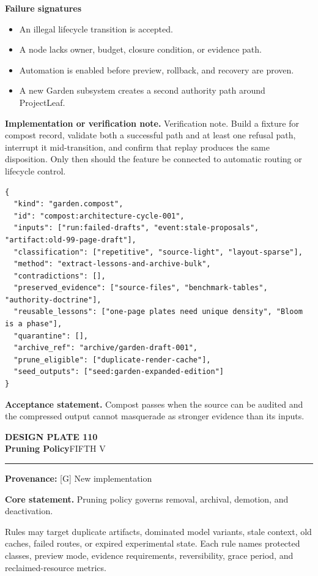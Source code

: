 \documentclass[10pt,letterpaper,oneside]{article}
\newcommand{\prov}[1]{\textcolor{gardenBlue}{\sffamily\footnotesize\textbf{Provenance:} #1}}
\newcommand{\platetitle}[3]{%
  \begin{minipage}[t][0.54in][t]{\textwidth}
  {\sffamily\bfseries\color{gardenDeep}\fontsize{9}{10}\selectfont DESIGN PLATE #1}\\[-1pt]
  {\sffamily\bfseries\color{gardenInk}\fontsize{16.5}{18}\selectfont #2}\hfill{\sffamily\color{gardenGreen}\large #3}
  \end{minipage}\vspace{-2pt}\hrule\vspace{5pt}}
\begin{document}
\textbf{Failure signatures}
\begin{itemize}
\item An illegal lifecycle transition is accepted.
\item A node lacks owner, budget, closure condition, or evidence path.
\item Automation is enabled before preview, rollback, and recovery are proven.
\item A new Garden subsystem creates a second authority path around ProjectLeaf.
\end{itemize}
\textbf{Implementation or verification note.} Verification note. Build a fixture for compost record, validate both a successful path and at least one refusal path, interrupt it mid-transition, and confirm that replay produces the same disposition. Only then should the feature be connected to automatic routing or lifecycle control.

\begin{lstlisting}
{
  "kind": "garden.compost",
  "id": "compost:architecture-cycle-001",
  "inputs": ["run:failed-drafts", "event:stale-proposals", "artifact:old-99-page-draft"],
  "classification": ["repetitive", "source-light", "layout-sparse"],
  "method": "extract-lessons-and-archive-bulk",
  "contradictions": [],
  "preserved_evidence": ["source-files", "benchmark-tables", "authority-doctrine"],
  "reusable_lessons": ["one-page plates need unique density", "Bloom is a phase"],
  "quarantine": [],
  "archive_ref": "archive/garden-draft-001",
  "prune_eligible": ["duplicate-render-cache"],
  "seed_outputs": ["seed:garden-expanded-edition"]
}
\end{lstlisting}
\begin{acceptbox}
\textbf{Acceptance statement.} Compost passes when the source can be audited and the compressed output cannot masquerade as stronger evidence than its inputs.
\end{acceptbox}
\newpage
\platetitle{110}{Pruning Policy}{FIFTH V}
\prov{[G] New implementation}
\fontsize{8.85}{10.45}\selectfont
\begin{corebox}
\textbf{Core statement.} Pruning policy governs removal, archival, demotion, and deactivation.
\end{corebox}
Rules may target duplicate artifacts, dominated model variants, stale context, old caches, failed routes, or expired experimental state. Each rule names protected classes, preview mode, evidence requirements, reversibility, grace period, and reclaimed-resource metrics.
\end{document}
